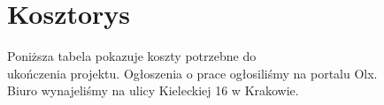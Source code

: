 \section{Kosztorys}
\label{sec:kosztorys}



\noindent  Poniższa tabela pokazuje koszty potrzebne do \\
ukończenia projektu. Ogłoszenia o prace ogłosiliśmy na portalu Olx. \\
Biuro wynajeliśmy na ulicy Kieleckiej 16 w Krakowie. 



